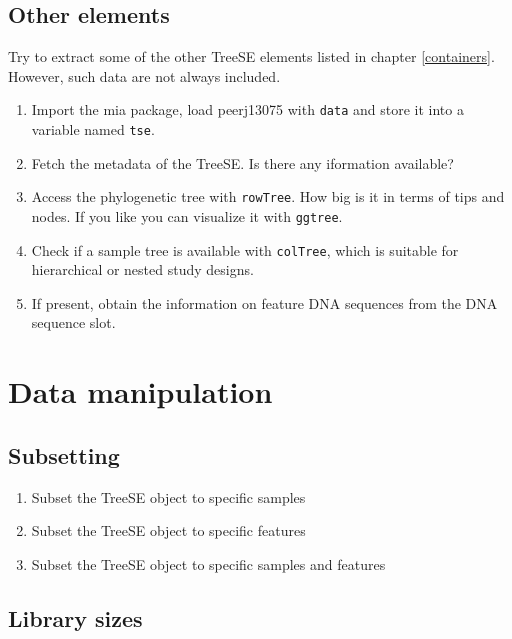 \documentclass[
]{book}
\providecommand{\tightlist}{%
  \setlength{\itemsep}{0pt}\setlength{\parskip}{0pt}}
\begin{document}
\hypertarget{other-elements}{%
\subsection{Other elements}\label{other-elements}}

Try to extract some of the other TreeSE elements listed in chapter \ref{containers}.
However, such data are not always included.

\begin{enumerate}
\def\labelenumi{\arabic{enumi}.}
\tightlist
\item
  Import the mia package, load peerj13075 with \texttt{data} and store it into a
  variable named \texttt{tse}.
\item
  Fetch the metadata of the TreeSE. Is there any iformation available?
\item
  Access the phylogenetic tree with \texttt{rowTree}. How big is it in terms of tips
  and nodes. If you like you can visualize it with \texttt{ggtree}.
\item
  Check if a sample tree is available with \texttt{colTree}, which is suitable for
  hierarchical or nested study designs.
\item
  If present, obtain the information on feature DNA sequences from the DNA
  sequence slot.
\end{enumerate}

\hypertarget{data-manipulation}{%
\section{Data manipulation}\label{data-manipulation}}

\hypertarget{subsetting-1}{%
\subsection{Subsetting}\label{subsetting-1}}

\begin{enumerate}
\def\labelenumi{\arabic{enumi}.}
\tightlist
\item
  Subset the TreeSE object to specific samples
\item
  Subset the TreeSE object to specific features
\item
  Subset the TreeSE object to specific samples and features
\end{enumerate}

\hypertarget{library-sizes}{%
\subsection{Library sizes}\label{library-sizes}}
\end{document}
